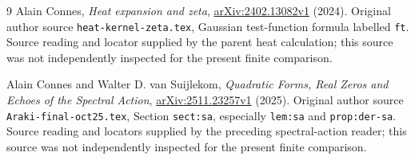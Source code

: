 \documentclass[11pt]{article}
\begin{document}
\begin{thebibliography}{9}
Alain Connes, \emph{Heat expansion and zeta},
\href{https://arxiv.org/abs/2402.13082v1}{arXiv:2402.13082v1} (2024).
Original author source \texttt{heat-kernel-zeta.tex}, Gaussian test-function
formula labelled \texttt{ft}. Source reading and locator supplied by the parent
heat calculation; this source was not independently inspected for the present
finite comparison.

Alain Connes and Walter D. van Suijlekom,
\emph{Quadratic Forms, Real Zeros and Echoes of the Spectral Action},
\href{https://arxiv.org/abs/2511.23257v1}{arXiv:2511.23257v1} (2025).
Original author source \texttt{Araki-final-oct25.tex},
Section \texttt{sect:sa}, especially \texttt{lem:sa} and
\texttt{prop:der-sa}. Source reading and locators supplied by the preceding
spectral-action reader; this source was not independently inspected for the
present finite comparison.
\end{thebibliography}
\end{document}
